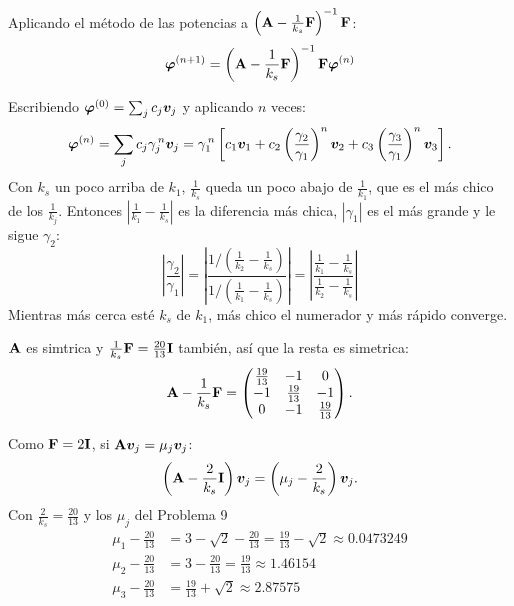 Aplicando el método de las potencias a $\left(\mathbf{A} - \frac{1}{k_s}\mathbf{F}\right)^{-1}\mathbf{F}$:
\[
\bm{\varphi}^{(n+1)} = \left(\mathbf{A} - \frac{1}{k_s}\mathbf{F}\right)^{-1}\mathbf{F}\bm{\varphi}^{(n)}
\]


Escribiendo $\bm{\varphi}^{(0)} = \sum_j c_j\bm{v}_j$ y aplicando $n$ veces:
\[
\bm{\varphi}^{(n)} = \sum_j c_j\gamma_j^{\,n}\bm{v}_j
= \gamma_1^{\,n}\left[c_1\bm{v}_1 + c_2\left(\frac{\gamma_2}{\gamma_1}\right)^n\bm{v}_2
+ c_3\left(\frac{\gamma_3}{\gamma_1}\right)^n\bm{v}_3\right].
\]
Con $k_s$ un poco arriba de $k_1$, $\frac1{k_s}$ queda un poco abajo de $\frac1{k_1}$, que es el más chico de los
$\frac1{k_j}$. Entonces $\left|\frac1{k_1} - \frac1{k_s}\right|$ es la diferencia más chica, $|\gamma_1|$ es el más grande
y le sigue $\gamma_2$:
\[
\left|\frac{\gamma_2}{\gamma_1}\right|
= \left|\frac{1\big/\left(\frac1{k_2} - \frac1{k_s}\right)}{1\big/\left(\frac1{k_1} - \frac1{k_s}\right)}\right|
= \left|\frac{\frac1{k_1} - \frac1{k_s}}{\frac1{k_2} - \frac1{k_s}}\right|
\]
Mientras más cerca esté $k_s$ de $k_1$, más chico el numerador y más rápido converge.




$\mathbf{A}$ es simtrica y $\frac{1}{k_s}\mathbf{F} = \frac{20}{13}\mathbf{I}$ también, así que la resta es simetrica:
\[
\mathbf{A} - \frac{1}{k_s}\mathbf{F} = \begin{pmatrix} \frac{19}{13} & -1 & 0\\ -1 & \frac{19}{13} & -1\\ 0 & -1 & \frac{19}{13} \end{pmatrix}.
\]

Como $\mathbf{F} = 2\mathbf{I}$, si $\mathbf{A}\bm{v}_j = \mu_j\bm{v}_j$:
\[
\left(\mathbf{A} - \frac{2}{k_s}\mathbf{I}\right)\bm{v}_j = \left(\mu_j - \frac{2}{k_s}\right)\bm{v}_j .
\]
Con $\frac{2}{k_s} = \frac{20}{13}$ y los $\mu_j$ del Problema 9
\begin{align*}
	\mu_1 - \tfrac{20}{13} &= 3 - \sqrt2 - \tfrac{20}{13} = \tfrac{19}{13} - \sqrt2 \approx 0.0473249\\
	\mu_2 - \tfrac{20}{13} &= 3 - \tfrac{20}{13} = \tfrac{19}{13} \approx 1.46154\\
	\mu_3 - \tfrac{20}{13} &= \tfrac{19}{13} + \sqrt2 \approx 2.87575
\end{align*}



